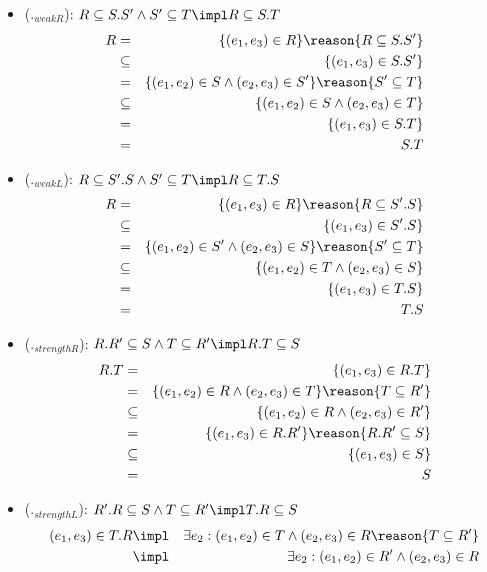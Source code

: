 \begin{itemize}
\item ($._{weakR}$): $R \subseteq S.S' \land S' \subseteq T \impl R \subseteq S.T$
\begin{eqnarray*}
R &=& \{(e_1,e_3) \in R\} \reason{R \subseteq S.S'} \\
&\subseteq & \{(e_1,e_3) \in S.S'\} \\
&=& \{(e_1,e_2) \in S \land (e_2,e_3) \in S'\} \reason{S' \subseteq T} \\
&\subseteq & \{(e_1,e_2) \in S \land (e_2,e_3) \in T\} \\
&=& \{(e_1,e_3) \in S.T\} \\
&=& S.T
\end{eqnarray*}
\item ($._{weakL}$): $R \subseteq S'.S \land S' \subseteq T \impl R \subseteq T.S$
\begin{eqnarray*}
R &=& \{(e_1,e_3) \in R\} \reason{R \subseteq S'.S} \\
&\subseteq & \{(e_1,e_3) \in S'.S\} \\
&=& \{(e_1,e_2) \in S' \land (e_2,e_3) \in S\} \reason{S' \subseteq T} \\
&\subseteq & \{(e_1,e_2) \in T \land (e_2,e_3) \in S\} \\
&=& \{(e_1,e_3) \in T.S\} \\
&=& T.S
\end{eqnarray*}
\item ($._{strengthR}$): $R.R' \subseteq S \land T \subseteq R' \impl R.T \subseteq S$
\begin{eqnarray*}
R.T &=& \{(e_1,e_3) \in R.T\} \\
&=& \{(e_1,e_2) \in R \land (e_2,e_3) \in T\} \reason{T \subseteq R'} \\
&\subseteq & \{(e_1,e_2) \in R \land (e_2,e_3) \in R'\} \\
&=& \{(e_1,e_3) \in R.R' \} \reason{R.R' \subseteq S} \\
&\subseteq & \{(e_1,e_3) \in S\} \\
&=& S 
\end{eqnarray*}
\item ($._{strengthL}$): $R'.R \subseteq S \land T \subseteq R' \impl T.R \subseteq S$
\begin{eqnarray*}
(e_1,e_3) \in T.R &\impl & \exists e_2: (e_1,e_2) \in T \land (e_2,e_3) \in R \reason{T \subseteq R'} \\
&\impl & \exists e_2: (e_1,e_2) \in R' \land (e_2,e_3) \in R \\

\end{eqnarray*}
\end{itemize}
